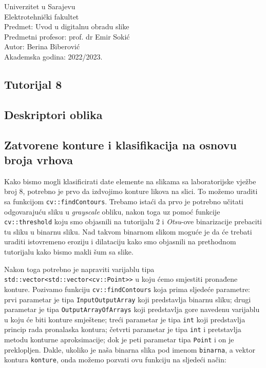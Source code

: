 \documentclass[a4paper, 12pt]{article}
\begin{document}
\noindent
Univerzitet u Sarajevu\\
Elektrotehnički fakultet\\
Predmet: Uvod u digitalnu obradu slike\\
Predmetni profesor: prof. dr Emir Sokić\\
Autor: Berina Biberović\\
Akademska godina: 2022/2023.


\begin{center}
    \section*{Tutorijal 8}
    \subsection*{Deskriptori oblika}    
\end{center}

\subsection*{Zatvorene konture i klasifikacija na osnovu broja vrhova}

Kako bismo mogli klasificirati date elemente na slikama sa laboratorijske vježbe broj 8, potrebno je prvo da izdvojimo konture likova na slici. To možemo uraditi sa funkcijom \lstinline{cv::findContours}. Trebamo istaći da prvo je potrebno učitati odgovarajuću sliku u \textit{grayscale} obliku, nakon toga uz pomoć funkcije \lstinline{cv::threshold} koju smo objasnili na tutorijalu 2 i \textit{Otsu}-ove binarizacije prebaciti tu sliku u binarnu sliku. Nad takvom binarnom slikom moguće je da će trebati uraditi istovremeno eroziju i dilataciju kako smo objasnili na prethodnom tutorijalu kako bismo makli šum sa slike. 

Nakon toga potrebno je napraviti varijablu tipa \lstinline{std::vector<std::vector<cv::Point>>} u koju ćemo smjestiti pronađene konture. Pozivamo funkciju \lstinline{cv::findContours} koja prima sljedeće parametre: prvi parametar je tipa \lstinline{InputOutputArray} koji predstavlja binarnu sliku; drugi parametar je tipa \lstinline{OutputArrayOfArrays} koji predstavlja gore navedenu varijablu u koju će biti konture smještene; treći parametar je tipa \lstinline{int} koji predstavlja princip rada pronalaska kontura; četvrti parametar je tipa \lstinline{int} i pretstavlja metodu konturne aproksimacije; dok je peti parametar tipa \lstinline{Point} i on je preklopljen. Dakle, ukoliko je naša binarna slika pod imenom \lstinline{binarna}, a vektor kontura \lstinline{konture}, onda možemo pozvati ovu funkciju na sljedeći način:
\end{document}

